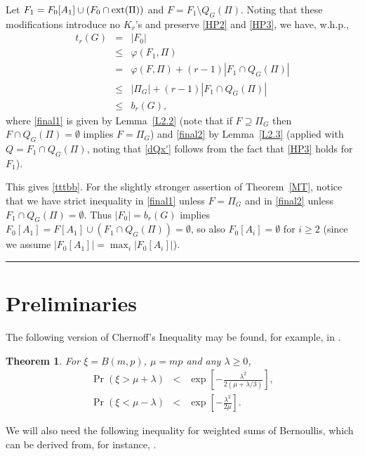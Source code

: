 \documentclass[letterpaper,11pt]{article}
\newtheorem{thm}{Theorem}[section]
\newcommand{\sm}[0]{\setminus}
\newcommand{\ext}[0]{{\rm ext}}
\newcommand{\bb}[0]{b}
\newcommand{\ttt}[0]{t}
\newcommand{\0}[0]{\emptyset}
\renewcommand{\qed}[0]{\begin{flushright} \rule{2mm}{3mm} \end{flushright}}
\newcommand{\gl}[0]{\lambda }
\newcommand{\vp}[0]{\varphi}
\begin{document}
\medskip
Let
$F_1 =F_0[A_1]\cup (F_0\cap \ext(\Pi))$ and $F=F_1\sm Q_G(\Pi)$.
Noting that these modifications introduce no $K_r$'s
and preserve
\eqref{HP2} and \eqref{HP3},
we have, w.h.p.,
%
\begin{eqnarray}
\ttt_r(G) &=&|F_0|\nonumber\\
& \leq & \vp(F_1,\Pi)\nonumber\\
& =& \vp(F,\Pi) + (r-1)|F_1\cap Q_G(\Pi)|\nonumber\\
&\leq & |\Pi_G| + (r-1)|F_1\cap Q_G(\Pi)|\label{final1}\\
&\leq &\bb_r(G),\label{final2}
\end{eqnarray}
where \eqref{final1} is given by Lemma~\ref{L2.2}
(note that if $F\supseteq \Pi_G$ then $F\cap Q_G(\Pi)=\0$
implies $F=\Pi_G$)
and \eqref{final2} by Lemma~\ref{L2.3}
(applied with $Q=F_1\cap Q_G(\Pi)$, noting that
\eqref{dQx'} follows from the fact that \eqref{HP3}
holds for $F_1$).
%

This gives
\eqref{tttbb}.
For the slightly stronger assertion of Theorem~\ref{MT},
notice that we have strict inequality in
\eqref{final1} unless $F=\Pi_G$
and in \eqref{final2} unless $F_1\cap Q_G(\Pi)=\0$.
Thus $|F_0|=b_r(G)$ implies
$F_0[A_1]=F[A_1]\cup (F_1\cap Q_G(\Pi))=\0$,
so also $F_0[A_i]=\0$ for $i\geq 2$
(since we assume $|F_0[A_1]|=\max_i |F_0[A_i]|$).
\qed





\section{Preliminaries}\label{PB}


The following version of
Chernoff's Inequality may be found, for example, in
\cite[Theorem 2.1]{JLR}.
\begin{thm}\label{Chern}
For $\xi =B(m,p)$, $\mu=mp$ and any $\gl\geq 0$,
\begin{eqnarray*}
\Pr(\xi >\mu+\gl)& < &\exp [- \tfrac{\gl^2}{2(\mu+\gl/3)}],\\
\Pr(\xi < \mu-\gl) &<& \exp [- \tfrac{\gl^2}{2\mu}].
\end{eqnarray*}
\end{thm}







\medskip
We will also need the following inequality for weighted sums of Bernoullis,
which can be derived from, for instance, \cite[Lemma 8.2]{Beck-Chen}.
\end{document}
